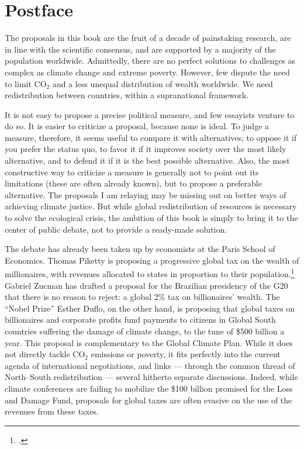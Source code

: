 \documentclass[a5paper,english,openany]{memoir}
\begin{document}
\chapter{Postface}

The proposals in this book are the fruit of a decade of painstaking research, are in line with the scientific consensus, and are supported by a majority of the population worldwide. 
Admittedly, there are no perfect solutions to challenges as complex as climate change and extreme poverty. 
However, few dispute the need to limit CO$_\text{2}$ and %
a less unequal distribution of wealth worldwide. We need redistribution between countries, within a supranational framework. 

It is not easy to propose a precise political measure, and few essayists venture to do so. It is easier to criticize a proposal, because none is ideal. To judge a measure, therefore, it seems useful to compare it with alternatives; to oppose it if you prefer the status quo, to favor it if it improves society over the most likely alternative, and to defend it if it is the best possible alternative. Also, the most constructive way to criticize a measure is generally not to point out its limitations (these are often already known), but to propose a preferable alternative. 
The proposals I am relaying may be missing out on better ways of achieving climate justice. 
But while global redistribution of resources is necessary to solve the ecological crisis, the ambition of this book is simply to bring it to the center of public debate, not to provide a ready-made solution. 

The debate has already been taken up by economists at the Paris School of Economics. Thomas Piketty is proposing a progressive global tax on the wealth of millionaires, with revenues allocated to states in proportion to their population.\footnote{\citet{piketty_brief_2022}.} 
Gabriel Zucman has drafted a proposal for the Brazilian presidency of the G20 that there is no reason to reject: a global 2\% tax on billionaires' wealth. %
The ``Nobel Prize'' Esther Duflo, on the other hand, is proposing that global taxes on billionaires and corporate profits fund payments to citizens in Global South countries suffering the damage of climate change, to the tune of \$500 billion a year. This proposal is complementary to the Global Climate Plan. While it does not directly tackle CO$_\text{2}$ emissions or poverty, it fits perfectly into the current agenda of international negotiations, and links --- through the common thread of North--South redistribution --- several hitherto separate discussions. Indeed, while climate conferences are failing to mobilize the \$100 billion promised for the Loss and Damage Fund, proposals for global taxes are often evasive on the use of the revenues from these taxes. 
\end{document}
